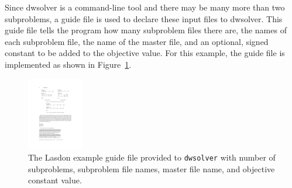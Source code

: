 \documentclass[11pt]{article} %
\begin{document}
Since dwsolver is a command-line tool and there may be many more than two subproblems, a guide file is used to declare these input files to dwsolver.  This guide file tells the program how many subproblem files there are, the names of each subproblem file, the name of the master file, and an optional, signed constant to be added to the objective value.  For this example, the guide file is implemented as shown in Figure~\ref{figGuideFile}.
\begin{figure}
\begin{center}
\includegraphics[width=0.22\textwidth]{guideFile.pdf}
 \caption{\label{figGuideFile} The Lasdon example guide file provided to {\tt dwsolver} with number of subproblems, subproblem file names, master file name, and objective constant value.}
 \end{center}
\end{figure}
\end{document}
